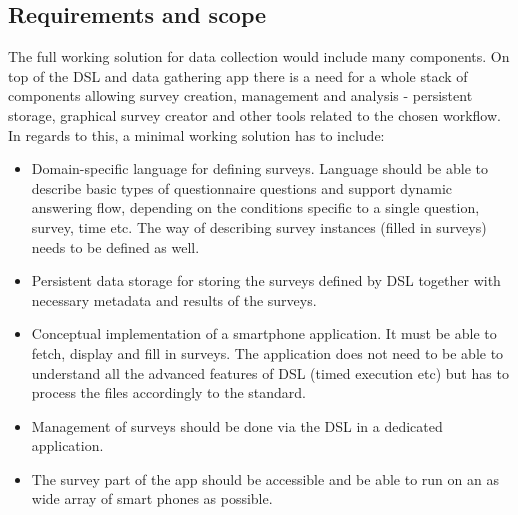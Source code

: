 \subsection{Requirements and scope}
The full working solution for data collection would include many components. On top of the DSL and data gathering app there is a need for a whole stack of components allowing survey creation, management and analysis - persistent storage, graphical survey creator and other tools related to the chosen workflow. In regards to this, a minimal working solution has to include:
\begin{itemize}
\item Domain-specific language for defining surveys. Language should be able to describe basic types of questionnaire questions and support dynamic answering flow, depending on the conditions specific to a single question, survey, time etc. The way of describing survey instances (filled in surveys) needs to be defined as well.
\item Persistent data storage for storing the surveys defined by DSL together with necessary metadata and results of the surveys.
\item Conceptual implementation of a smartphone application. It must be able to fetch, display and fill in surveys. The application does not need to be able to understand all the advanced features of DSL (timed execution etc) but has to process the files accordingly to the standard.
\item Management of surveys should be done via the DSL in a dedicated application.
\item The survey part of the app should be accessible and be able to run on an as wide array of smart phones as possible.
\end{itemize}